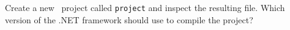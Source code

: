 Create a new \csharp\ project called \texttt{project} and inspect the resulting  file. Which version of the .NET framework should  use to compile the project?
